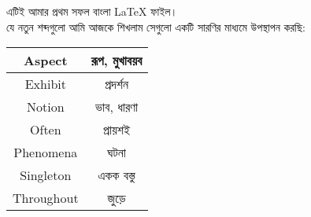 \documentclass[16 pt]{article}
\begin{document}
এটিই আমার প্রথম সফল বাংলা \LaTeX{} ফাইল। \\
যে নতুন শব্দগুলো আমি আজকে শিখলাম সেগুলো একটি সারণির মাধ্যমে উপস্থাপন করছি: \\
\begin{tabular}{| c | c |}
	\hline 
	Aspect & রূপ, মুখাবয়ব \\ 
	\hline
	Exhibit & প্রদর্শন \\ 
	\hline
	Notion & ভাব, ধারণা \\ 
	\hline
	Often & প্রায়শই \\ 
	\hline
	Phenomena & ঘটনা \\ 
	\hline
	Singleton & একক বস্তু \\ 
	\hline
	Throughout & জুড়ে \\ 
	\hline
\end{tabular}

	
\end{document}
